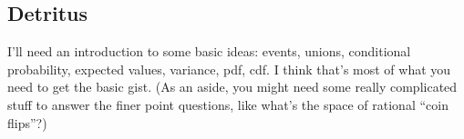 \subsection{Detritus}\label{detritus}

I'll need an introduction to some basic ideas: events, unions,
conditional probability, expected values, variance, pdf, cdf. I think
that's most of what you need to get the basic gist. (As an aside, you
might need some really complicated stuff to answer the finer point
questions, like what's the space of rational ``coin flips''?)